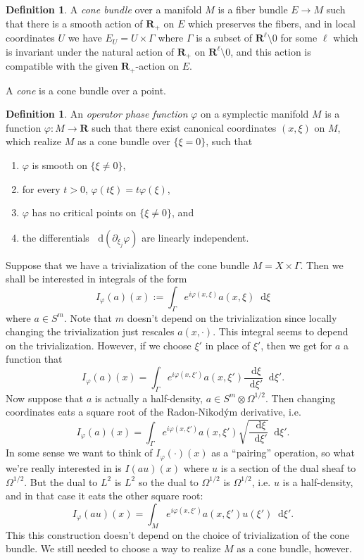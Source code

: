 \documentclass[reqno,12pt,letterpaper]{amsart}
\newcommand{\RR}{\mathbf{R}}
\newcommand*\dif{\mathop{}\!\mathrm{d}}
\newcommand{\dfn}[1]{\emph{#1}\index{#1}}
\theoremstyle{definition}
\newtheorem{definition}[theorem]{Definition}
\numberwithin{equation}{section}
\begin{document}
\begin{definition}
A \dfn{cone bundle} over a manifold $M$ is a fiber bundle $E \to M$ such that there is a smooth action of $\RR_+$ on $E$ which preserves the fibers, and in local coordinates $U$ we have $E_U = U \times \Gamma$ where $\Gamma$ is a subset of $\RR^\ell \setminus 0$ for some $\ell$ which is invariant under the natural action of $\RR_+$ on $\RR^\ell \setminus 0$, and this action is compatible with the given $\RR_+$-action on $E$.

A \dfn{cone} is a cone bundle over a point.
\end{definition}

\begin{definition}
An \dfn{operator phase function} $\varphi$ on a symplectic manifold $M$ is a function $\varphi: M \to \RR$ such that there exist canonical coordinates $(x, \xi)$ on $M$, which realize $M$ as a cone bundle over $\{\xi = 0\}$, such that
\begin{enumerate}
\item $\varphi$ is smooth on $\{\xi \neq 0\}$,
\item for every $t > 0$, $\varphi(t\xi) = t\varphi(\xi)$,
\item $\varphi$ has no critical points on $\{\xi \neq 0\}$, and
\item the differentials $\dif(\partial_{\xi_j} \varphi)$ are linearly independent.
\end{enumerate}
\end{definition}

Suppose that we have a trivialization of the cone bundle $M = X \times \Gamma$. Then we shall be interested in integrals of the form
\begin{equation}\label{oscillatory integral}
I_\varphi(a)(x) := \int_\Gamma e^{i\varphi(x, \xi)} a(x, \xi) \dif \xi
\end{equation}
where $a \in S^m$. Note that $m$ doesn't depend on the trivialization since locally changing the trivialization just rescales $a(x, \cdot)$.
This integral seems to depend on the trivialization. However, if we choose $\xi'$ in place of $\xi'$, then we get for $a$ a function that 
$$I_\varphi(a)(x) = \int_\Gamma e^{i\varphi(x, \xi')} a(x, \xi') \frac{\dif \xi}{\dif \xi'} \dif \xi'.$$
Now suppose that $a$ is actually a half-density, $a \in S^m \otimes \Omega^{1/2}$.
Then changing coordinates eats a square root of the Radon-Nikod\'ym derivative, i.e. 
$$I_\varphi(a)(x) = \int_\Gamma e^{i\varphi(x, \xi')} a(x, \xi') \sqrt{\frac{\dif \xi}{\dif \xi'}} \dif \xi'.$$
In some sense we want to think of $I_\varphi(\cdot)(x)$ as a ``pairing'' operation, so what we're really interested in is $I(au)(x)$ where $u$ is a section of the dual sheaf to $\Omega^{1/2}$.
But the dual to $L^2$ is $L^2$ so the dual to $\Omega^{1/2}$ is $\Omega^{1/2}$, i.e. $u$ is a half-density, and in that case it eats the other square root:
$$I_\varphi(au)(x) = \int_M e^{i\varphi(x, \xi')} a(x, \xi') u(\xi') \dif \xi'.$$
This this construction doesn't depend on the choice of trivialization of the cone bundle.
We still needed to choose a way to realize $M$ as a cone bundle, however.
\end{document}
